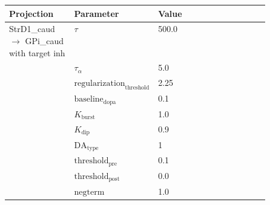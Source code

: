 \documentclass{article}
\begin{document}
\noindent
\begin{tabularx}{\linewidth}{|p{0.25\linewidth}|p{0.25\linewidth}|X|}\hline
\textbf{Projection} & \textbf{Parameter} & \textbf{Value}   \\ \hline

    StrD1\_caud  $\rightarrow$ GPi\_caud with target inh & $\tau$        & 500.0  \\ \hline

     & $\tau_\alpha$        & 5.0  \\ \hline

     & ${\text{regularization}}_{\text{threshold}}$        & 2.25  \\ \hline

     & ${\text{baseline}}_{\text{dopa}}$        & 0.1  \\ \hline

     & $K_{\text{burst}}$        & 1.0  \\ \hline

     & $K_{\text{dip}}$        & 0.9  \\ \hline

     & ${\text{DA}}_{\text{type}}$        & 1  \\ \hline

     & ${\text{threshold}}_{\text{pre}}$        & 0.1  \\ \hline

     & ${\text{threshold}}_{\text{post}}$        & 0.0  \\ \hline

     & ${\text{negterm}}$        & 1.0  \\ \hline

\end{tabularx}

\vspace{2ex}
\end{document}

